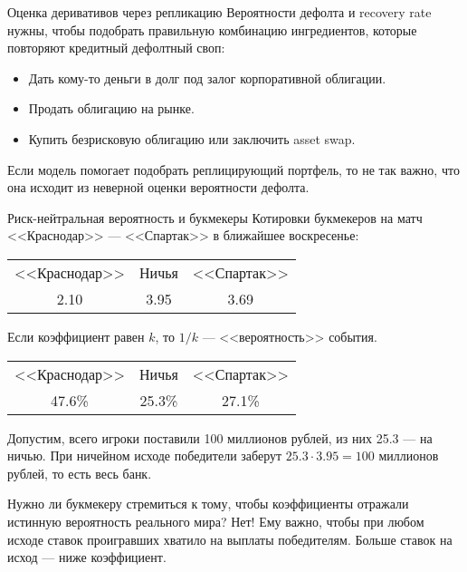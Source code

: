 \documentclass{beamer}
\begin{document}
\begin{frame}{Оценка деривативов через репликацию}
\justify
Вероятности дефолта и recovery rate нужны, чтобы подобрать правильную комбинацию 
ингредиентов, которые повторяют кредитный дефолтный своп:

\justify
\begin{itemize}
\justifying
\item Дать кому-то деньги в долг под залог корпоративной облигации.
\item Продать облигацию на рынке.
\item Купить безрисковую облигацию или заключить asset swap.
\end{itemize}

\justify
Если модель помогает подобрать реплицирующий портфель, то не так важно, что она исходит из неверной оценки вероятности дефолта.
\end{frame}



\begin{frame}{Риск-нейтральная вероятность и букмекеры}
\justify
Котировки букмекеров на матч <<Краснодар>> --- <<Спартак>> в ближайшее воскресенье:

\centering
\begin{tabular}{c|c|c}
<<Краснодар>> & Ничья & <<Спартак>> \\
2.10 & 3.95 & 3.69
\end{tabular}

\justify
Если коэффициент равен $k$, то $1/k$ --- <<вероятность>> события.

\centering
\begin{tabular}{c|c|c}
<<Краснодар>> & Ничья & <<Спартак>> \\
47.6\% & 25.3\% & 27.1\%
\end{tabular}

\justify
Допустим, всего игроки поставили 100 миллионов рублей, из них 25.3 --- на ничью. При 
ничейном исходе победители заберут $25.3 \cdot 3.95 = 100$ миллионов рублей, то 
есть весь банк.

\justify
Нужно ли букмекеру стремиться к тому, чтобы коэффициенты отражали истинную вероятность реального мира? Нет! Ему важно, чтобы при любом исходе ставок проигравших хватило на выплаты победителям. Больше ставок на исход --- ниже коэффициент.
\end{frame}
\end{document}
